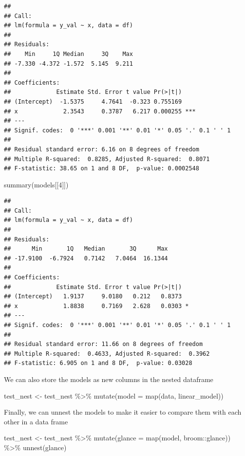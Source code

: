 \documentclass[
]{book}
\newenvironment{Shaded}{\begin{snugshade}}{\end{snugshade}}
\newcommand{\AttributeTok}[1]{\textcolor[rgb]{0.77,0.63,0.00}{#1}}
\newcommand{\DecValTok}[1]{\textcolor[rgb]{0.00,0.00,0.81}{#1}}
\newcommand{\FunctionTok}[1]{\textcolor[rgb]{0.00,0.00,0.00}{#1}}
\newcommand{\NormalTok}[1]{#1}
\newcommand{\OtherTok}[1]{\textcolor[rgb]{0.56,0.35,0.01}{#1}}
\newcommand{\SpecialCharTok}[1]{\textcolor[rgb]{0.00,0.00,0.00}{#1}}
\begin{document}
\begin{verbatim}
## 
## Call:
## lm(formula = y_val ~ x, data = df)
## 
## Residuals:
##    Min     1Q Median     3Q    Max 
## -7.330 -4.372 -1.572  5.145  9.211 
## 
## Coefficients:
##             Estimate Std. Error t value Pr(>|t|)    
## (Intercept)  -1.5375     4.7641  -0.323 0.755169    
## x             2.3543     0.3787   6.217 0.000255 ***
## ---
## Signif. codes:  0 '***' 0.001 '**' 0.01 '*' 0.05 '.' 0.1 ' ' 1
## 
## Residual standard error: 6.16 on 8 degrees of freedom
## Multiple R-squared:  0.8285, Adjusted R-squared:  0.8071 
## F-statistic: 38.65 on 1 and 8 DF,  p-value: 0.0002548
\end{verbatim}

\begin{Shaded}
\begin{Highlighting}[]
\FunctionTok{summary}\NormalTok{(models[[}\DecValTok{4}\NormalTok{]])}
\end{Highlighting}
\end{Shaded}

\begin{verbatim}
## 
## Call:
## lm(formula = y_val ~ x, data = df)
## 
## Residuals:
##      Min       1Q   Median       3Q      Max 
## -17.9100  -6.7924   0.7142   7.0464  16.1344 
## 
## Coefficients:
##             Estimate Std. Error t value Pr(>|t|)  
## (Intercept)   1.9137     9.0180   0.212   0.8373  
## x             1.8838     0.7169   2.628   0.0303 *
## ---
## Signif. codes:  0 '***' 0.001 '**' 0.01 '*' 0.05 '.' 0.1 ' ' 1
## 
## Residual standard error: 11.66 on 8 degrees of freedom
## Multiple R-squared:  0.4633, Adjusted R-squared:  0.3962 
## F-statistic: 6.905 on 1 and 8 DF,  p-value: 0.03028
\end{verbatim}

We can also store the models as new columns in the nested dataframe

\begin{Shaded}
\begin{Highlighting}[]
\NormalTok{test\_nest }\OtherTok{\textless{}{-}}\NormalTok{ test\_nest }\SpecialCharTok{\%\textgreater{}\%} 
  \FunctionTok{mutate}\NormalTok{(}\AttributeTok{model =} \FunctionTok{map}\NormalTok{(data, linear\_model))}
\end{Highlighting}
\end{Shaded}

Finally, we can unnest the models to make it easier to compare them with each other in a data frame

\begin{Shaded}
\begin{Highlighting}[]
\NormalTok{test\_nest }\OtherTok{\textless{}{-}}\NormalTok{ test\_nest }\SpecialCharTok{\%\textgreater{}\%} 
  \FunctionTok{mutate}\NormalTok{(}\AttributeTok{glance =} \FunctionTok{map}\NormalTok{(model, broom}\SpecialCharTok{::}\NormalTok{glance)) }\SpecialCharTok{\%\textgreater{}\%} 
  \FunctionTok{unnest}\NormalTok{(glance)}
\end{Highlighting}
\end{Shaded}
\end{document}
